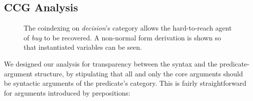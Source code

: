 \documentclass[11pt]{article}
\begin{document}


\subsection{CCG Analysis}


\begin{figure*}
\centering
{}
\caption{\small The coindexing on \emph{decision}'s category allows the hard-to-reach agent of
\emph{buy} to be recovered. A non-normal form derivation is shown so that instantiated
variables can be seen. \label{fig:decision_to}}\end{figure*}

We designed our analysis for transparency between the syntax and the predicate-argument
structure, by stipulating that all and only the core arguments should
be syntactic arguments of the predicate's category. This is fairly straightforward
for arguments introduced by prepositions:

\begin{center}
\end{center}
\end{document}
